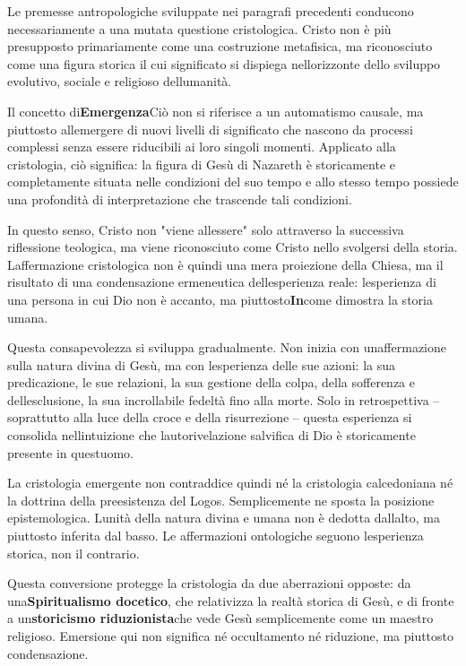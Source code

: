 \documentclass[
]{article}
\begin{document}
Le premesse antropologiche sviluppate nei paragrafi precedenti conducono necessariamente a una mutata questione cristologica. Cristo non è più presupposto primariamente come una costruzione metafisica, ma riconosciuto come una figura storica il cui significato si dispiega nell\textquotesingle orizzonte dello sviluppo evolutivo, sociale e religioso dell\textquotesingle umanità.

Il concetto di\textbf{Emergenza}Ciò non si riferisce a un automatismo causale, ma piuttosto all\textquotesingle emergere di nuovi livelli di significato che nascono da processi complessi senza essere riducibili ai loro singoli momenti. Applicato alla cristologia, ciò significa: la figura di Gesù di Nazareth è storicamente e completamente situata nelle condizioni del suo tempo e allo stesso tempo possiede una profondità di interpretazione che trascende tali condizioni.

In questo senso, Cristo non "viene all\textquotesingle essere" solo attraverso la successiva riflessione teologica, ma viene riconosciuto come Cristo nello svolgersi della storia. L\textquotesingle affermazione cristologica non è quindi una mera proiezione della Chiesa, ma il risultato di una condensazione ermeneutica dell\textquotesingle esperienza reale: l\textquotesingle esperienza di una persona in cui Dio non è accanto, ma piuttosto\textbf{In}come dimostra la storia umana.

Questa consapevolezza si sviluppa gradualmente. Non inizia con un\textquotesingle affermazione sulla natura divina di Gesù, ma con l\textquotesingle esperienza delle sue azioni: la sua predicazione, le sue relazioni, la sua gestione della colpa, della sofferenza e dell\textquotesingle esclusione, la sua incrollabile fedeltà fino alla morte. Solo in retrospettiva -- soprattutto alla luce della croce e della risurrezione -- questa esperienza si consolida nell\textquotesingle intuizione che l\textquotesingle autorivelazione salvifica di Dio è storicamente presente in quest\textquotesingle uomo.

La cristologia emergente non contraddice quindi né la cristologia calcedoniana né la dottrina della preesistenza del Logos. Semplicemente ne sposta la posizione epistemologica. L\textquotesingle unità della natura divina e umana non è dedotta dall\textquotesingle alto, ma piuttosto inferita dal basso. Le affermazioni ontologiche seguono l\textquotesingle esperienza storica, non il contrario.

Questa conversione protegge la cristologia da due aberrazioni opposte: da una\textbf{Spiritualismo docetico}, che relativizza la realtà storica di Gesù, e di fronte a un\textbf{storicismo riduzionista}che vede Gesù semplicemente come un maestro religioso. Emersione qui non significa né occultamento né riduzione, ma piuttosto condensazione.
\end{document}
